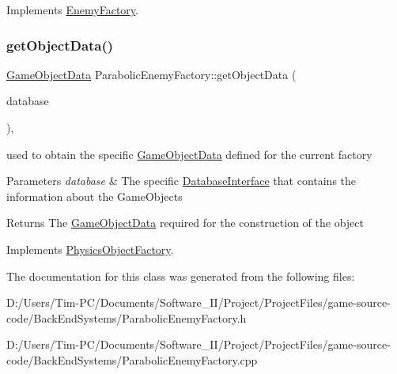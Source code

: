 Implements \hyperlink{class_enemy_factory_ae064082d650e676960cb84ebb60ba216}{Enemy\+Factory}.

\mbox{\label{class_parabolic_enemy_factory_acc62c48a8eb5af162910dc48d9fe8900}} 
\subsubsection{\texorpdfstring{get\+Object\+Data()}{getObjectData()}}
{\footnotesize\ttfamily \hyperlink{struct_game_object_data}{Game\+Object\+Data} Parabolic\+Enemy\+Factory\+::get\+Object\+Data (\begin{DoxyParamCaption}\item[{const std\+::shared\+\_\+ptr$<$ \hyperlink{class_database_interface}{Database\+Interface} $>$ \&}]{database }\end{DoxyParamCaption})\hspace{0.3cm}{\ttfamily [override]}, {\ttfamily [virtual]}}



used to obtain the specific \hyperlink{struct_game_object_data}{Game\+Object\+Data} defined for the current factory 


\begin{DoxyParams}{Parameters}
{\em database} & The specific \hyperlink{class_database_interface}{Database\+Interface} that contains the information about the Game\+Objects \\
\hline
\end{DoxyParams}
\begin{DoxyReturn}{Returns}
The \hyperlink{struct_game_object_data}{Game\+Object\+Data} required for the construction of the object 
\end{DoxyReturn}


Implements \hyperlink{class_physics_object_factory_aa59f52d3adc1fac676f4a8a3c2de9ba9}{Physics\+Object\+Factory}.



The documentation for this class was generated from the following files\+:\begin{DoxyCompactItemize}
\item 
D\+:/\+Users/\+Tim-\/\+P\+C/\+Documents/\+Software\+\_\+\+I\+I/\+Project/\+Project\+Files/game-\/source-\/code/\+Back\+End\+Systems/Parabolic\+Enemy\+Factory.\+h\item 
D\+:/\+Users/\+Tim-\/\+P\+C/\+Documents/\+Software\+\_\+\+I\+I/\+Project/\+Project\+Files/game-\/source-\/code/\+Back\+End\+Systems/Parabolic\+Enemy\+Factory.\+cpp\end{DoxyCompactItemize}
